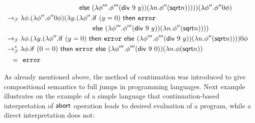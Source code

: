 \begin{example}
\begin{align}
 & \phantom{ \lambda \phi.   ( \lambda \phi'. \phi' ( \lambda y. ( \lambda \phi''. }  \mathsf{else}  \  (\lambda \phi'''. \phi''' (\mathsf{div} \ 9 \ y) )  (\lambda n.  \phi''(  \mathsf{sqrt}  n)) ) ))  (\lambda \phi''. \phi'' 0 \phi) \notag \\
  \bconv \ & \lambda \phi.   (\lambda \phi''. \phi'' 0 \phi) ( \lambda y. ( \lambda \phi''.    \mathsf{if} \ (y = 0)  \ \mathsf{then} \ \mathtt{error} \notag \\
  & \phantom{ \lambda \phi.   (\lambda \phi''. \phi'' 0 \phi) ( \lambda y. ( \lambda \phi''.   }  \mathsf{else}  \  (\lambda \phi'''. \phi''' (\mathsf{div} \ 9 \ y) )  (\lambda n.  \phi''(  \mathsf{sqrt}  n)) ) )  \notag \\
  \bconv \ & \lambda \phi.   ( \lambda y. ( \lambda \phi''.    \mathsf{if} \ (y = 0)  \ \mathsf{then} \ \mathtt{error} \ \mathsf{else}  \  (\lambda \phi'''. \phi''' (\mathsf{div} \ 9 \ y) )  (\lambda n.  \phi''(  \mathsf{sqrt}  n)) ) ) 0 \phi \notag \\
    \bred \ & \lambda \phi. \mathsf{if} \ (0 = 0)  \ \mathsf{then} \ \mathtt{error} \ \mathsf{else}  \  (\lambda \phi'''. \phi''' (\mathsf{div} \ 9 \ 0) )  (\lambda n.  \phi(  \mathsf{sqrt}  n))  \notag \\
=  \ & \ \mathtt{error} \notag %
\end{align}
\end{example}

As already mentioned above, the method of continuation was introduced to give compositional semantics to full jumps in programming languages. Next example illustrates on the example of a simple language that continuation-based interpretation of $\mathsf{abort}$ operation leads to desired evaluation of a program, while a direct interpretation does not:

